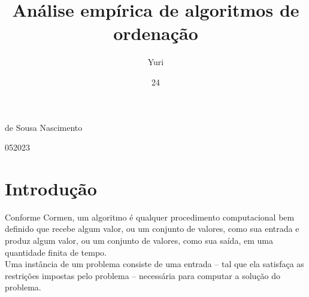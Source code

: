 \documentclass[report]{uftex}
\newcommand\uftex{UF\TeX}
\begin{document}
  \title{Análise empírica de algoritmos de ordenação}
  \author{Yuri}{de Sousa Nascimento}
  \date{24}{05}{2023}
  \foreignkeyword{\LaTeX}
  \foreignkeyword{\uftex}
  \maketitle

  \frontmatter
  
  \printlosymbols  
  \printloabbreviations
  \tableofcontents %
\mainmatter
\onehalfspacing
\chapter{Introdução}

Conforme Cormen, um algoritmo é qualquer procedimento computacional bem definido que recebe algum valor, ou um conjunto de valores, como sua entrada e produz algum valor, ou um conjunto de valores, como sua saída, em uma quantidade finita de tempo.\\

Uma instância de um problema consiste de uma entrada – tal que ela satisfaça as restrições impostas pelo problema – necessária para computar a solução do problema.\\
\end{document}
